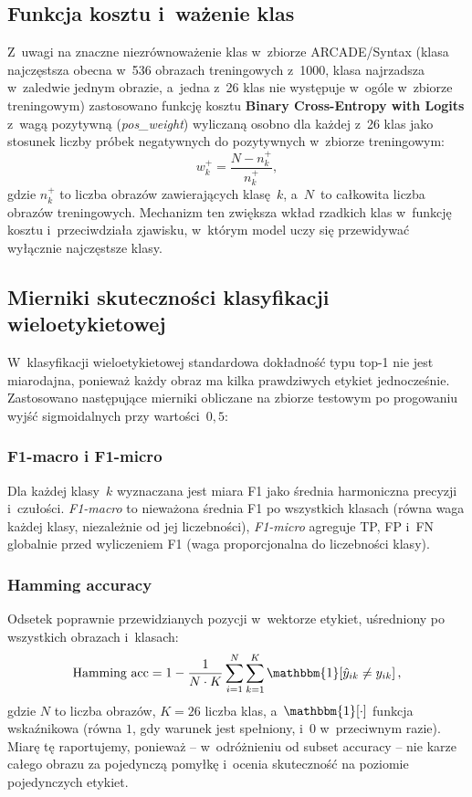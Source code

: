 \documentclass[12pt,a4paper]{article}
\begin{document}
\subsection{Funkcja kosztu i~ważenie klas}

Z~uwagi na znaczne niezrównoważenie klas w~zbiorze ARCADE/Syntax (klasa najczęstsza obecna w~536 obrazach treningowych z~1000, klasa najrzadsza w~zaledwie jednym obrazie, a~jedna z~26 klas nie występuje w~ogóle w~zbiorze treningowym) zastosowano funkcję kosztu \textbf{Binary Cross-Entropy with Logits} z~wagą pozytywną (\textit{pos\_weight}) wyliczaną osobno dla każdej z~26 klas jako stosunek liczby próbek negatywnych do pozytywnych w~zbiorze treningowym:
\begin{equation}
    w_k^{+} = \frac{N - n_k^{+}}{n_k^{+}},
\end{equation}
gdzie $n_k^{+}$ to liczba obrazów zawierających klasę~$k$, a~$N$~to całkowita liczba obrazów treningowych. Mechanizm ten zwiększa wkład rzadkich klas w~funkcję kosztu i~przeciwdziała zjawisku, w~którym model uczy się przewidywać wyłącznie najczęstsze klasy.

\subsection{Mierniki skuteczności klasyfikacji wieloetykietowej}

W~klasyfikacji wieloetykietowej standardowa dokładność typu top-1 nie jest miarodajna, ponieważ każdy obraz ma kilka prawdziwych etykiet jednocześnie. Zastosowano następujące mierniki obliczane na zbiorze testowym po progowaniu wyjść sigmoidalnych przy wartości~$0{,}5$:

\subsubsection{F1-macro i F1-micro}
Dla każdej klasy~$k$ wyznaczana jest miara F1 jako średnia harmoniczna precyzji i~czułości. \textit{F1-macro} to nieważona średnia F1 po wszystkich klasach (równa waga każdej klasy, niezależnie od jej liczebności), \textit{F1-micro} agreguje TP, FP i~FN globalnie przed wyliczeniem F1 (waga proporcjonalna do liczebności klasy).

\subsubsection{Hamming accuracy}
Odsetek poprawnie przewidzianych pozycji w~wektorze etykiet, uśredniony po wszystkich obrazach i~klasach:
\begin{equation}
    \text{Hamming acc} = 1 - \frac{1}{N \cdot K} \sum_{i=1}^{N} \sum_{k=1}^{K} \mathbbm{1}\!\left[\hat{y}_{ik} \neq y_{ik}\right],
\end{equation}
gdzie $N$ to liczba obrazów, $K=26$ liczba klas, a~$\mathbbm{1}[\cdot]$ funkcja wskaźnikowa (równa $1$, gdy warunek jest spełniony, i~$0$ w~przeciwnym razie). Miarę tę raportujemy, ponieważ -- w~odróżnieniu od subset accuracy -- nie karze całego obrazu za pojedynczą pomyłkę i~ocenia skuteczność na poziomie pojedynczych etykiet.
\end{document}
